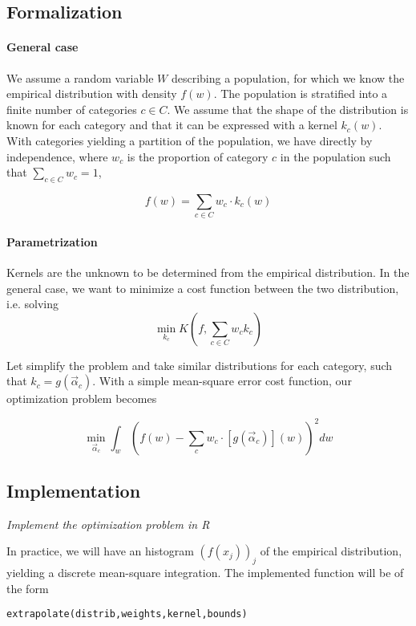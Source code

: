 \subsection{Formalization}

\paragraph{General case}

We assume a random variable $W$ describing a population, for which we know the empirical distribution with density $f(w)$. The population is stratified into a finite number of categories $c\in C$. We assume that the shape of the distribution is known for each category and that it can be expressed with a kernel $k_c (w)$. With categories yielding a partition of the population, we have directly by independence, where $w_c$ is the proportion of category $c$ in the population such that $\sum_{c\in C} w_c = 1$,

\[
f(w) = \sum_{c\in C} w_c \cdot k_c (w)
\]

\paragraph{Parametrization}

Kernels are the unknown to be determined from the empirical distribution. In the general case, we want to minimize a cost function between the two distribution, i.e. solving
\[\min_{k_c} K(f,\sum_{c\in C} w_c k_c)\]

Let simplify the problem and take similar distributions for each category, such that $k_c = g(\vec{\alpha}_c)$. With a simple mean-square error cost function, our optimization problem becomes

\[
\min_{\vec{\alpha}_c} \int_w \left(f(w) - \sum_c w_c \cdot \left[ g(\vec{\alpha}_c)\right] (w) \right)^2 dw
\]


\subsection{Implementation}

\textit{Implement the optimization problem in R}

In practice, we will have an histogram $\left(f(x_j)\right)_j$ of the empirical distribution, yielding a discrete mean-square integration. The implemented function will be of the form

\texttt{extrapolate(distrib,weights,kernel,bounds)}

